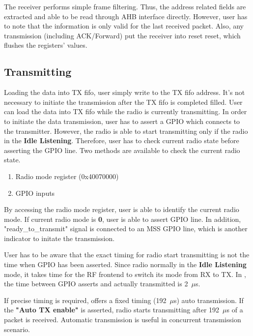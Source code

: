 The receiver performs simple frame filtering. Thus, the address related fields are extracted 
and able to be read through AHB interface directly. However, user has to note that the information
is only valid for the last received packet. Also, any transmission (including ACK/Forward) put the 
receiver into reset reset, which flushes the registers' values.

\subsection{Transmitting}
Loading the data into TX fifo, user simply write to the TX fifo address. It's not necessary to initiate
the transmission after the TX fifo is completed filled. User can load the data into TX fifo while
the radio is currently transmitting. In order to initiate the
data transmission, user has to assert a GPIO which connects to the transmitter. However, the radio
is able to start transmitting only if the radio in the {\bf Idle Listening}. Therefore, user has
to check current radio state before asserting the GPIO line. Two methods are available to check the
current radio state.
\begin{enumerate}
	\item Radio mode register (0x40070000)
	\item GPIO inputs
\end{enumerate}
By accessing the radio mode register, user is able to identify the current radio mode. If current
radio mode is {\bf 0}, user is able to assert GPIO line. In addition, "ready\_to\_transmit" signal is 
connected to an MSS GPIO line, which is another indicator to initate the transmission.

User has to be aware that the exact timing for radio start transmitting is not the time when GPIO
has been asserted. Since radio normally in the {\bf Idle Listening} mode, it takes time for the
RF frontend to switch its mode from RX to TX. In \sdr, the time between GPIO asserts and actually
transmitted is 2~$\mu$s.

If precise timing is required, \sdr offers a fixed timing (192~$\mu$s) auto transmission. If the
{\bf "Auto TX enable"} is asserted, radio starts transmitting after 192~$\mu$s of a packet is received.
Automatic transmission is useful in concurrent transmission scenario.


